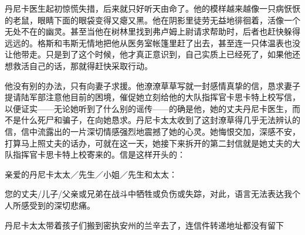     丹尼卡医生起初惊慌失措，后来就只好听天由命了。他的模样越来越像一只病恹恹的老鼠，眼睛下面的眼袋变得又瘪又黑。他在阴影里徒劳无益地徘徊着，活像一个无处不在的幽灵。甚至当他在树林里找到弗卢姆上尉请求帮助时，后者也赶快躲得远远的。格斯和韦斯无情地把他从医务室帐篷里赶了出去，甚至连一只体温表也没让他带走。只是到了这个时候，他才真正意识到，自己实质上已经死了，如果他还想救活自己的话，那就得赶快采取行动。

    他没有别的办法，只有向妻子求援。他潦潦草草写就一封感情真挚的信，恳求妻子提请陆军部注意他目前的困境，催促她立刻给他的大队指挥官卡思卡特上校写信，以便证实——无论她听到了什么别的谣传——的确是他，她的丈夫丹尼卡医生，而不是什么死尸和骗子，在向她恳求。丹尼卡太太收到了这封潦草得几乎无法辨认的信，信中流露出的一片深切情感强烈地震撼了她的心灵。她悔恨交加，深感不安，打算马上照丈夫的话办，可就在这一天，她接下来拆开的第二封信就是她丈夫的大队指挥官卡思卡特上校寄来的。信是这样开头的：

    亲爱的丹尼卡太太／先生／小姐／先生和太太：

    您的丈夫/儿子/父亲或兄弟在战斗中牺牲或负伤或失踪，对此，语言无法表达我个人所感受到的深切悲痛。

    丹尼卡太太带着孩子们搬到密执安州的兰辛去了，连信件转递地址都没有留下
